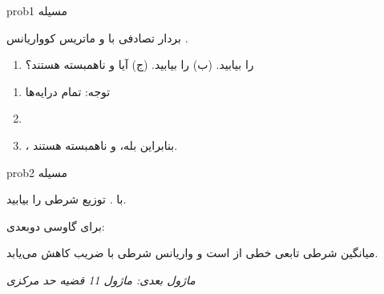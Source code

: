 \begin{PSbox}[unbreakable]{prob}{مسیله 1}

بردار تصادفی  با  و ماتریس کوواریانس .

\begin{enumerate}
\def\labelenumi{(\PSalph{enumi})}
\tightlist
\item
   را بیابید. (ب)  را بیابید. (ج) آیا  و  ناهمبسته هستند؟
\end{enumerate}

\PSsolution{} 

\begin{enumerate}
\def\labelenumi{(\PSalph{enumi})}
\tightlist
\item
  \PSbr{}توجه:  تمام درایه‌ها 
\item
\item
  ، بنابراین بله،  و  ناهمبسته هستند.
\end{enumerate}

\end{PSbox}

\begin{PSbox}[unbreakable]{prob}{مسیله 2}

 با . توزیع شرطی  را بیابید.

\PSsolution{} برای گاوسی دوبعدی:\PSbr{}\PSbr{}

میانگین شرطی تابعی خطی از  است و واریانس شرطی با ضریب  کاهش می‌یابد.

\end{PSbox}

\emph{ماژول بعدی: {ماژول 11  قضیه حد مرکزی}}
